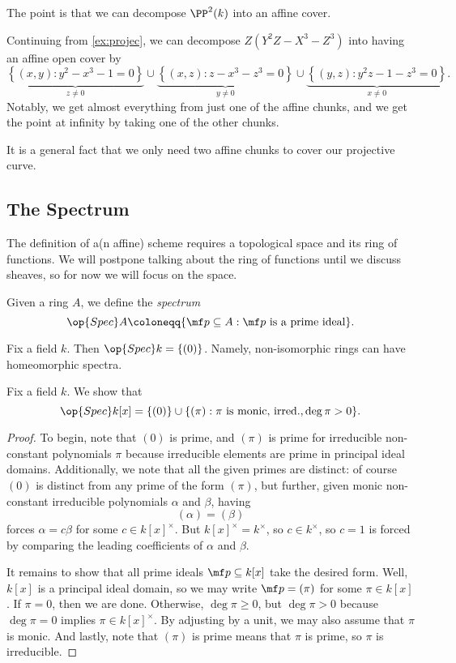 \documentclass[../notes.tex]{subfiles}
\begin{document}
The point is that we can decompose $\PP^2(k)$ into an affine cover.
\begin{example}
	Continuing from \autoref{ex:projec}, we can decompose $Z\left(Y^2Z-X^3-Z^3\right)$ into having an affine open cover by
	\[\underbrace{\left\{(x,y):y^2-x^3-1=0\right\}}_{z\ne0}\cup\underbrace{\left\{(x,z):z-x^3-z^3=0\right\}}_{y\ne0}\cup\underbrace{\left\{(y,z):y^2z-1-z^3=0\right\}}_{x\ne0}.\]
	Notably, we get almost everything from just one of the affine chunks, and we get the point at infinity by taking one of the other chunks.
\end{example}
\begin{remark}
	It is a general fact that we only need two affine chunks to cover our projective curve.
\end{remark}

\subsection{The Spectrum}
The definition of a(n affine) scheme requires a topological space and its ring of functions. We will postpone talking about the ring of functions until we discuss sheaves, so for now we will focus on the space.
\begin{definition}[Spectrum]
	Given a ring $A$, we define the \textit{spectrum}
	\[\op{Spec}A\coloneqq\{\mf p\subseteq A:\mf p\text{ is a prime ideal}\}.\]
\end{definition}
\begin{example}
	Fix a field $k$. Then $\op{Spec}k=\{(0)\}$. Namely, non-isomorphic rings can have homeomorphic spectra.
\end{example}
\begin{exe} \label{exe:speckx}
	Fix a field $k$. We show that
	\[\op{Spec}k[x]=\{(0)\}\cup\{(\pi):\pi\text{ is monic, irred.},\deg\pi>0\}.\]
\end{exe}
\begin{proof}
	To begin, note that $(0)$ is prime, and $(\pi)$ is prime for irreducible non-constant polynomials $\pi$ because irreducible elements are prime in principal ideal domains. Additionally, we note that all the given primes are distinct: of course $(0)$ is distinct from any prime of the form $(\pi)$, but further, given monic non-constant irreducible polynomials $\alpha$ and $\beta$, having
	\[(\alpha)=(\beta)\]
	forces $\alpha=c\beta$ for some $c\in k[x]^\times$. But $k[x]^\times=k^\times$, so $c\in k^\times$, so $c=1$ is forced by comparing the leading coefficients of $\alpha$ and $\beta$.

	It remains to show that all prime ideals $\mf p\subseteq k[x]$ take the desired form. Well, $k[x]$ is a principal ideal domain, so we may write $\mf p=(\pi)$ for some $\pi\in k[x]$. If $\pi=0$, then we are done. Otherwise, $\deg\pi\ge0$, but $\deg\pi>0$ because $\deg\pi=0$ implies $\pi\in k[x]^\times$. By adjusting by a unit, we may also assume that $\pi$ is monic. And lastly, note that $(\pi)$ is prime means that $\pi$ is prime, so $\pi$ is irreducible.
\end{proof}
\end{document}

